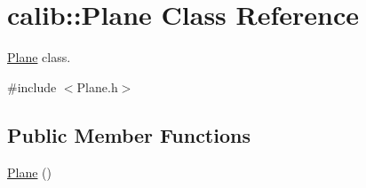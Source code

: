 \hypertarget{classcalib_1_1Plane}{\section{calib\-:\-:Plane Class Reference}
\label{classcalib_1_1Plane}
}


\hyperlink{classcalib_1_1Plane}{Plane} class.  




{\ttfamily \#include $<$Plane.\-h$>$}

\subsection*{Public Member Functions}
\begin{DoxyCompactItemize}
\item 
\hypertarget{classcalib_1_1Plane_a110f0a87fc58db42b3cf49c907b9a524}{\hyperlink{classcalib_1_1Plane_a110f0a87fc58db42b3cf49c907b9a524}{Plane} ()}\label{classcalib_1_1Plane_a110f0a87fc58db42b3cf49c907b9a524}


\end{DoxyCompactItemize}
